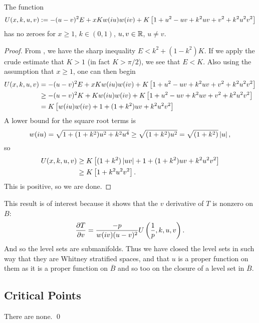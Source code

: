 \begin{lem}
The function
\[
U(x,k,u,v) := -(u-v)^2 E + xKw(i u)w(i v) + K\left[ 1 + u^2 - uv + k^2 uv + v^2 + k^2 u^2 v^2 \right]
\]
has no zeroes for $x \geq 1$, $k\in (0,1)$, $u,v \in \mathbb{R}$, $u\neq v$.
\begin{proof}
From \cite{Anderson}, we have the sharp inequality $E < k^2 + (1-k^2)K$. If we apply the crude estimate that $K>1$ (in fact $K > π/2$), we see that $E < K$. Also using the assumption that $x\geq 1$, one can then begin
\begin{align*}
U(x,k,u,v)
&= -(u-v)^2 E + xKw(i u)w(i v) + K\left[ 1 + u^2 - uv + k^2 uv + v^2 + k^2 u^2 v^2 \right] \\
&\geq -(u-v)^2 K + Kw(i u)w(i v) + K\left[ 1 + u^2 - uv + k^2 uv + v^2 + k^2 u^2 v^2 \right] \\
&= K \left[ w(i u)w(i v) + 1 + (1 + k^2) uv + k^2 u^2 v^2 \right]
\end{align*}
A lower bound for the square root terms is
\[
w(i u) = \sqrt{1 + (1+k^2)u^2 + k^2u^4} \geq \sqrt{(1+k^2)u^2} = \sqrt{(1+k^2)}\left|u\right|,
\]
so
\begin{align*}
U(x,k,u,v)
&\geq K \left[ (1+k^2)\left|uv\right| + 1 + (1 + k^2) uv + k^2 u^2 v^2 \right] \\
&\geq K \left[ 1 + k^2 u^2 v^2 \right].
\end{align*}
This is positive, so we are done.
\end{proof}
\end{lem}

This result is of interest because it shows that the $v$ derivative of $T$ is nonzero on $B$:
\[
\frac{\partial T}{\partial v}
= \frac{-p}{w(i v)(u-v)^2} U\left( \frac{1}{p},k,u,v \right).
\]
And so the level sets are submanifolds. Thus we have closed the level sets in such way that they are Whitney stratified spaces, and that $u$ is a proper function on them as it is a proper function on $\overline{B}$ and so too on the closure of a level set in $\overline{B}$. 






\subsection{Critical Points}
\label{sub:Critical Points}
There are none. \qed
